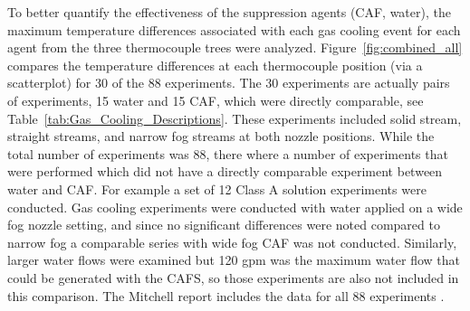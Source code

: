 \documentclass[12pt,oneside]{book}
\begin{document}
To better quantify the effectiveness of the suppression agents (CAF, water), the maximum temperature differences associated with each gas cooling event for each agent from the three thermocouple trees were analyzed. Figure~\ref{fig:combined_all} compares the temperature differences at each thermocouple position (via a scatterplot) for 30 of the 88 experiments. The 30 experiments are actually pairs of experiments, 15 water and 15 CAF, which were directly comparable, see Table~\ref{tab:Gas_Cooling_Descriptions}. These experiments included solid stream, straight streams, and narrow fog streams at both nozzle positions. While the total number of experiments was 88, there where a number of experiments that were performed which did not have a directly comparable experiment between water and CAF. For example a set of 12 Class A solution experiments were conducted. Gas cooling experiments were conducted with water applied on a wide fog nozzle setting, and since no significant differences were noted compared to narrow fog a comparable series with wide fog CAF was not conducted. Similarly, larger water flows were examined but 120 gpm was the maximum water flow that could be generated with the CAFS, so those experiments are also not included in this comparison. The Mitchell report includes the data for all 88 experiments \cite{Mitchell:1}. 
   
\end{document}
